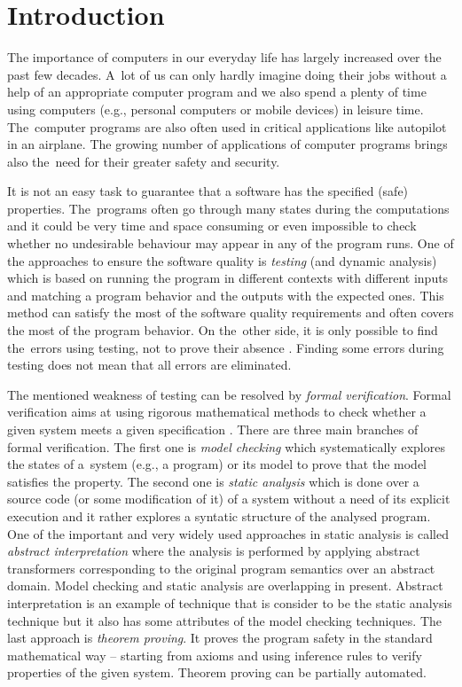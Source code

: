 \chapter{Introduction}

The importance of computers in our everyday life has largely increased over the past few decades.
A~lot of us can only hardly imagine doing their jobs without a help of an appropriate computer program
and we also spend a plenty of time using computers (e.g., personal computers or mobile devices) in leisure time.
The~computer programs are also often used in critical applications like autopilot in an airplane.
The growing number of applications of computer programs brings also the~need for their greater safety and security.

It is not an easy task to guarantee that a software has the specified (safe) properties.
The~programs often go through many states during the computations
and it could be very time and space consuming or even impossible to check whether no undesirable behaviour
may appear in any of the program runs.
One of the approaches to ensure the software quality is \emph{testing} (and dynamic analysis) which is based
on running the program in different contexts with different inputs
and matching a program behavior and the outputs with the expected ones.
This method can satisfy the most of the software quality requirements and often covers the most of the program behavior.
On the~other side, it is only possible to find the~errors using testing, not to prove their absence \cite{dijkstra}.
Finding some errors during testing does not mean that all errors are eliminated.

The mentioned weakness of testing can be resolved by \emph{formal verification}.
Formal verification aims at using rigorous mathematical methods to check whether a given system meets a given specification \cite{fav:lecture}.
There are three main branches of formal verification.
The first one is \emph{model checking} which systematically explores the states of a~system (e.g., a program) or its model to
prove that the model satisfies the property.
The second one is \emph{static analysis} which is done over a source code (or some modification of it) of a system
without a need of its explicit execution and it rather explores a syntatic structure of the analysed program.
One of the important and very widely used approaches in static analysis is called \emph{abstract interpretation} where the analysis is performed by
applying abstract transformers corresponding to the original program semantics over an abstract domain.
Model checking and static analysis are overlapping in present.
Abstract interpretation is an example of technique that is consider
to be the static analysis technique but it also has some attributes of
the model checking techniques.
The last approach is \emph{theorem proving}.
It proves the program safety in the standard mathematical way --
starting from axioms and using inference rules to verify properties of the given system.
Theorem proving can be partially automated.

